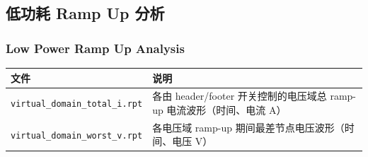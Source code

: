 \subsection{低功耗 Ramp Up 分析}
\subsubsection*{Low Power Ramp Up Analysis}

\begin{table}[htbp]
\centering
\small
\begin{tabular}{@{}p{4.5cm}p{8cm}@{}}
\toprule
文件 & 说明 \\
\midrule
\texttt{virtual\_domain\_total\_i.rpt} & 各由 header/footer 开关控制的电压域总 ramp-up 电流波形（时间、电流 A） \\
\texttt{virtual\_domain\_worst\_v.rpt} & 各电压域 ramp-up 期间最差节点电压波形（时间、电压 V） \\
\bottomrule
\end{tabular}
\end{table}
